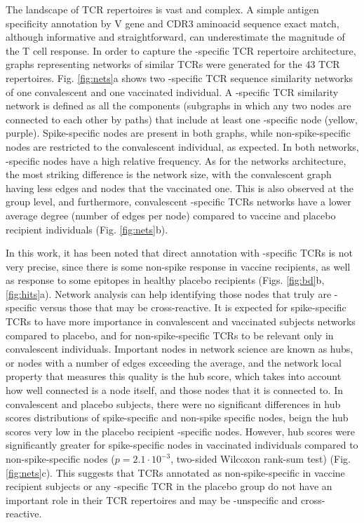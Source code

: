 The landscape of TCR repertoires is vast and complex. A simple antigen specificity annotation by V gene and CDR3 aminoacid sequence exact match, although informative and straightforward, can underestimate the magnitude of the T cell response. In order to capture the \covid-specific TCR repertoire architecture, graphs representing networks of similar TCRs were generated for the 43 TCR repertoires. Fig. \ref{fig:nets}a shows two \covid-specific TCR sequence similarity networks of one convalescent and one vaccinated individual. A \covid-specific TCR similarity network is defined as all the components (subgraphs in which any two nodes are connected to each other by paths) that include at least one \covid-specific node (yellow, purple). Spike-specific nodes are present in both graphs, while non-spike-specific nodes are restricted to the convalescent individual, as expected. In both networks, \covid-specific nodes have a high relative frequency. As for the networks architecture, the most striking difference is the network size, with the convalescent graph having less edges and nodes that the vaccinated one. This is also observed at the group level, and furthermore, convalescent \covid-specific TCRs networks have a lower average degree (number of edges per node) compared to vaccine and placebo recipient individuals (Fig. \ref{fig:nets}b).

In this work, it has been noted that direct annotation with \covid-specific TCRs is not very precise, since there is some non-spike response in vaccine recipients, as well as response to some \covid{} epitopes in healthy placebo recipients (Figs. \ref{fig:bd}b, \ref{fig:hits}a). Network analysis can help identifying those nodes that truly are \covid-specific versus those that may be cross-reactive. It is expected for spike-specific TCRs to have more importance in convalescent and vaccinated subjects networks compared to placebo, and for non-spike-specific TCRs to be relevant only in convalescent individuals. Important nodes in network science are known as hubs, or nodes with a number of edges exceeding the average, and the network local property that measures this quality is the hub score, which takes into account how well connected is a node itself, and those nodes that it is connected to. In convalescent and placebo subjects, there were no significant differences in hub scores distributions of spike-specific and non-spike specific nodes, beign the hub scores very low in the placebo recipient \covid-specific nodes. However, hub scores were significantly greater for spike-specific nodes in vaccinated individuals compared to non-spike-specific nodes ($p = 2.1\cdot10^{-3}$, two-sided Wilcoxon rank-sum test) (Fig. \ref{fig:nets}c). This suggests that TCRs annotated as non-spike-specific in vaccine recipient subjects or any \covid-specific TCR in the placebo group do not have an important role in their TCR repertoires and may be \covid-unspecific and cross-reactive.

